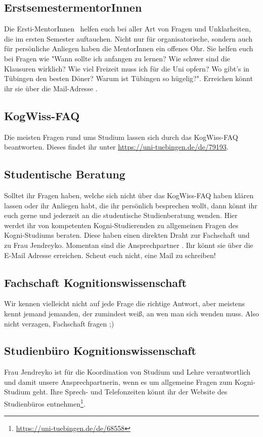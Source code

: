 \subsection*{ErstsemestermentorInnen}
Die Ersti-MentorInnen \kognimentoren ~helfen euch bei aller Art von Fragen und Unklarheiten, die im ersten Semester auftauchen. Nicht nur für organisatorische, sondern auch für persönliche Anliegen haben die MentorInnen ein offenes Ohr. Sie helfen euch bei Fragen wie "Wann sollte ich anfangen zu lernen? Wie schwer sind die Klausuren wirklich? Wie viel Freizeit muss ich für die Uni opfern? Wo gibt's in Tübingen den besten Döner? Warum ist Tübingen so hügelig?". Erreichen könnt ihr sie über die Mail-Adresse . 

\subsection*{KogWiss-FAQ}
Die meisten Fragen rund ums Studium lassen sich durch das KogWiss-FAQ beantworten. Dieses findet ihr unter \url{https://uni-tuebingen.de/de/79193}.

\subsection*{Studentische Beratung}
Solltet ihr Fragen haben, welche sich nicht über das KogWiss-FAQ haben klären lassen oder ihr Anliegen habt, die ihr persönlich besprechen wollt, dann könnt ihr euch gerne und jederzeit an die studentische Studienberatung wenden. Hier werdet ihr von kompetenten Kogni-Studierenden zu allgemeinen Fragen des Kogni-Studiums beraten. Diese haben einen direkten Draht zur Fachschaft und zu Frau Jendreyko.  Momentan sind die Ansprechpartner \studBeratung. Ihr könnt sie über die E-Mail Adresse  erreichen. Scheut euch nicht, eine Mail zu schreiben!

\subsection*{Fachschaft Kognitionswissenschaft}
Wir kennen vielleicht nicht auf jede Frage die richtige Antwort, aber meistens kennt jemand jemanden, der zumindest weiß, an wen man sich wenden muss. Also nicht verzagen, Fachschaft fragen ;)

\subsection*{Studienbüro Kognitionswissenschaft}
Frau Jendreyko ist für die Koordination von Studium und Lehre verantwortlich und damit unsere Ansprechpartnerin, wenn es um allgemeine Fragen zum Kogni-Studium geht. Ihre Sprech- und Telefonzeiten könnt ihr der Website des Studienbüros entnehmen\footnote{\url{https://uni-tuebingen.de/de/68558}}.

